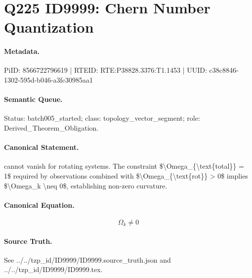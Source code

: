 \section*{Q225 ID9999: Chern Number Quantization}
\paragraph{Metadata.}
PiID: 8566722796619 | RTEID: RTE:P38828.3376:T1.1453 | UUID: c38c8846-1302-595d-b046-a3fc30985aa1

\paragraph{Semantic Queue.}
Status: batch005\_started; class: topology\_vector\_segment; role: Derived\_Theorem\_Obligation.

\paragraph{Canonical Statement.}
cannot vanish for rotating systems. The constraint \$\textbackslash{}Omega\_\{\textbackslash{}text\{total\}\} = 1\$ required by observations combined with \$\textbackslash{}Omega\_\{\textbackslash{}text\{rot\}\} > 0\$ implies \$\textbackslash{}Omega\_k \textbackslash{}neq 0\$, establishing non-zero curvature.

\paragraph{Canonical Equation.}
\[
\Omega_k \neq 0
\]

\paragraph{Source Truth.}
See ../../tzp\_id/ID9999/ID9999.source\_truth.json and ../../tzp\_id/ID9999/ID9999.tex.
